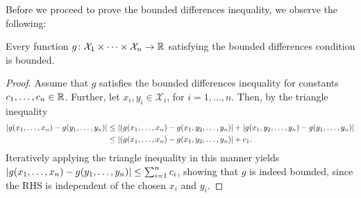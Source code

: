 Before we proceed to prove the bounded differences inequality, we observe the following:

\begin{lemma}
\label{lem: bounded differences condition}
Every function $g \colon \mathcal{X}_1 \times \dots \times \mathcal{X}_n \to \mathbb{R}$ satisfying the bounded differences condition is bounded.
\end{lemma}

\begin{proof}
Assume that $g$ satisfies the bounded differences inequality for constants $c_1, \dots, c_n \in \mathbb{R}$. Further, let $x_i, y_i \in \mathcal{X}_i$, for $i = 1, \dots, n$. Then, by the triangle inequality
\begin{align*}
    \abs{g(x_1, \dots, x_n) - g(y_1, \dots, y_n)} &\leq \abs{(g(x_1, \dots, x_n) - g(x_1, y_2, \dots, y_n)} + \abs{g(x_1, y_2, \dots, y_n) - g(y_1, \dots, y_n)} \\
    &\leq \abs{(g(x_1, \dots, x_n) - g(x_1, y_2, \dots, y_n)} + c_1.
\end{align*}
Iteratively applying the triangle inequality in this manner yields $\abs{g(x_1, \dots, x_n) - g(y_1, \dots, y_n)} \leq \sum_{i=1}^n c_i$, showing that $g$ is indeed bounded, since the RHS is independent of the chosen $x_i$ and $y_i$.
\end{proof}

